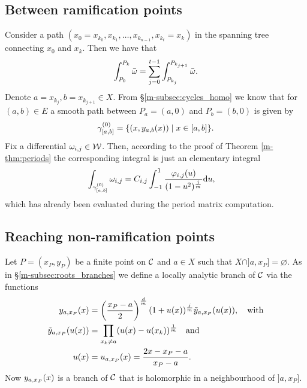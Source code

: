 \documentclass[main.tex]{subfiles}
\begin{document}
  
   
  \subsection{Between ramification points}\label{subsec:ajm_bp}

  Consider a path $(x_0=x_{k_0},x_{k_1},\dots,x_{k_{n-1}},x_{k_t}=x_k)$ in the spanning tree connecting $x_0$ and $x_k$. Then we have that
  \begin{align}
    \int_{P_0}^{P_k} \bar{\omega} = \sum_{j = 0}^{t-1}  \int_{P_{k_j}}^{P_{k_{j+1}}} \bar{\omega}.
  \end{align}
  Denote $a = x_{k_j}, b = x_{k_{j+1}} \in X$. From \S \ref{m-subsec:cycles_homo} we know that for $(a,b) \in E$ a smooth path between $P_a=(a,0)$ and $P_b=(b,0)$ is given by
  \begin{align*}
   \gamma_{[a,b]}^{(0)} = \{  (x,y_{a,b}(x))  \mid  x \in [a,b]  \}.
  \end{align*}
  Fix a differential $\omega_{i,j} \in \mathcal{W}$. Then, according to the proof of Theorem \ref{m-thm:periods} the corresponding integral is just an elementary integral
  \begin{align}
   \int_{\gamma_{[a,b]}^{(0)}} \omega_{i,j}  & =  C_{i,j}  \int_{-1}^1 \frac{\varphi_{i,j}(u)}{(1-u^2)^{\frac{j}{m}}} \mathrm d u,
  \end{align}
  which has already been evaluated during the period matrix computation.


  \subsection{Reaching non-ramification points}\label{subsec:ajm_finite}

   Let $P = (x_P,y_P)$ be a finite point on $\mathcal{C}$ and $a \in X$ such that $X\cap]a,x_P]=\varnothing$. As in \S \ref{m-subsec:roots_branches} we define a locally analytic branch of $\mathcal{C}$ via the functions
  \begin{align}\label{def:yax}
  \begin{split}
   y_{a,x_P}(x)  & =  \left(\frac{x_P-a}{2}\right)^{\frac{d}{m}}  (1 + u(x))^{\frac{j}{m}}  \tilde{y}_{a,x_P}(u(x)), \quad \text{with} \\
   \tilde{y}_{a,x_P}(u(x))  & =  \prod_{x_k \ne a} (u(x) - u(x_k))^{\frac{1}{m}} \quad \text{and} \\
   u(x) & =  u_{a,x_P}(x) = \frac{2x-x_P-a}{x_P-a}.
   \end{split}
  \end{align}
  Now $y_{a,x_P}(x)$ is a branch of $\mathcal{C}$ that is holomorphic in a neighbourhood of $]a,x_P]$.
\end{document}
